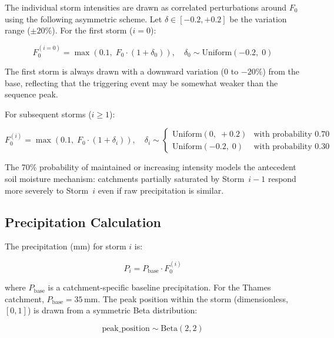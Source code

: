 \documentclass[11pt,a4paper]{article}
\begin{document}
The individual storm intensities are drawn as correlated perturbations around $F_0$
using the following asymmetric scheme. Let $\delta \in [-0.2, +0.2]$ be the
variation range ($\pm 20\%$). For the first storm ($i=0$):

\begin{equation}
  F_0^{(i=0)} = \max\!\left(0.1,\; F_0 \cdot \left(1 + \delta_0\right)\right),
  \quad \delta_0 \sim \mathrm{Uniform}(-0.2,\; 0)
  \label{eq:first_storm_intensity}
\end{equation}

\noindent The first storm is always drawn with a downward variation (0 to $-20\%$)
from the base, reflecting that the triggering event may be somewhat weaker than the
sequence peak.

For subsequent storms ($i \geq 1$):

\begin{equation}
  F_0^{(i)} = \max\!\left(0.1,\; F_0 \cdot \left(1 + \delta_i\right)\right),
  \quad \delta_i \sim
  \begin{cases}
    \mathrm{Uniform}(0,\; +0.2) & \text{with probability } 0.70 \\
    \mathrm{Uniform}(-0.2,\; 0) & \text{with probability } 0.30
  \end{cases}
  \label{eq:later_storm_intensity}
\end{equation}

\noindent The 70\% probability of maintained or increasing intensity models the
antecedent soil moisture mechanism: catchments partially saturated by Storm~$i{-}1$
respond more severely to Storm~$i$ even if raw precipitation is similar.

\subsection{Precipitation Calculation}

The precipitation (mm) for storm $i$ is:

\begin{equation}
  P_i = P_{\text{base}} \cdot F_0^{(i)}
  \label{eq:precipitation}
\end{equation}

\noindent where $P_{\text{base}}$ is a catchment-specific baseline precipitation. For
the Thames catchment, $P_{\text{base}} = 35\,\text{mm}$. The peak position within the
storm (dimensionless, $[0,1]$) is drawn from a symmetric Beta distribution:

\begin{equation}
  \text{peak\_position} \sim \mathrm{Beta}(2, 2)
  \label{eq:peak_pos}
\end{equation}
\end{document}

